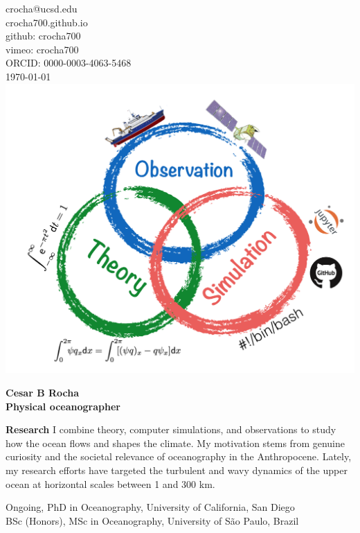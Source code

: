 \documentclass[a4paper,11pt,final]{memoir}
\newcommand{\Sep}{\vspace{1.25em}}
\newcommand{\SmallSep}{\vspace{0.5em}}
\newenvironment{Research}
    {\ignorespaces\textbf{\color{NavyBlue} Research}}
\newcommand{\CVSection}[1]
    {\Large\textbf{#1}\par
    \SmallSep\normalsize\normalfont}
\begin{document}
%

\begin{flushright}\small
    crocha@ucsd.edu\\[.1cm]
    crocha700.github.io\\[.1cm]
    github: crocha700\\[.1cm]
    vimeo: crocha700\\[.1cm]
    ORCID: 0000-0003-4063-5468\\[.1cm]
    \textcolor[gray]{0.45}{\mydate\today}\\[.1cm]
    \includegraphics[width=.185\textwidth]{theory_comp_obs2.png}
\end{flushright}\normalsize
\framebreak

\Huge\bfseries { \color{NavyBlue}  Cesar B Rocha} \\
\Large\bfseries Physical oceanographer \\

\normalsize\normalfont

\begin{Research}
I combine theory, computer simulations, and observations to study how the ocean flows and shapes the climate.
My motivation stems from genuine curiosity and the societal relevance
of oceanography in the Anthropocene. Lately, my research efforts have
targeted the turbulent and wavy dynamics of the upper ocean at horizontal scales between 1 and 300 km.

\end{Research}

\Sep


Ongoing, PhD in Oceanography, University of California, San Diego \\
BSc (Honors), MSc in Oceanography, University of S\~ao Paulo, Brazil

\Sep

\end{document}
